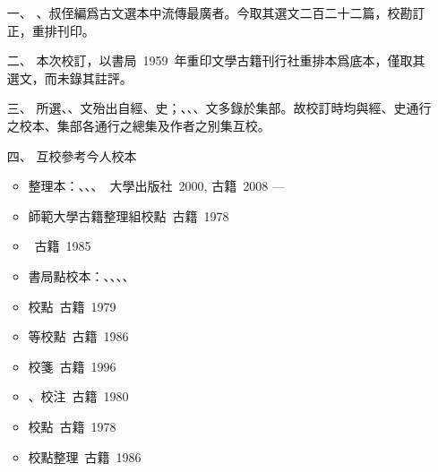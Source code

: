\begin{enumerate}
    \item[一、] 、叔侄編爲古文選本中流傳最廣者。今取其選文二百二十二篇，校勘訂正，重排刊印。
    \item[二、] 本次校訂，以書局\ 1959\ 年重印文學古籍刊行社重排本爲底本，僅取其選文，而未錄其註評。
    \item[三、] 所選、、文殆出自經、史；、、、文多錄於集部。故校訂時均與經、史通行之校本、集部各通行之總集及作者之別集互校。
    \item[四、] 互校參考今人校本
    \begin{itemize}
        \item {}整理本：、、、\ {\small {}大學出版社\ 2000, 古籍\ 2008 ---}
        \item {}師範大學古籍整理組校點\ {\small {}古籍\ 1978}
        \item {}\ {\small {}古籍\ 1985}
        \item {}書局點校本：、、、、
        \item {}校點\ {\small {}古籍\ 1979}
        \item {}等校點\ {\small {}古籍\ 1986}
        \item {}校箋\ {\small {}古籍\ 1996}
        \item {}、校注\ {\small {}古籍\ 1980}
        \item {}校點\ {\small {}古籍\ 1978}
        \item {}校點整理\ {\small {}古籍\ 1986}

\end{itemize}
\end{enumerate}
